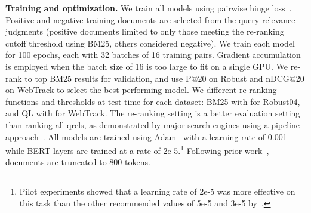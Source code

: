 \documentclass[sigconf]{acmart}
\begin{document}
\textbf{Training and optimization.} We train all models using pairwise hinge loss~\cite{Dehghani2017NeuralRM}. Positive and negative training documents are selected from the query relevance judgments (positive documents limited to only those meeting the re-ranking cutoff threshold  using BM25, others considered negative).
We train each model for 100 epochs, each with 32 batches of 16 training pairs. Gradient accumulation is employed when the batch size of 16 is too large to fit on a single GPU. We re-rank to top  BM25 results for validation, and use P@20 on Robust and nDCG@20 on WebTrack to select the best-performing model. We different re-ranking functions and thresholds at test time for each dataset: BM25 with  for Robust04, and QL with  for WebTrack. The re-ranking setting is a better evaluation setting than ranking all qrels, as demonstrated by major search engines using a pipeline approach~\cite{Rosset2018OptimizingQE}. All models are trained using Adam~\cite{Kingma2015AdamAM} with a learning rate of 0.001 while BERT layers are trained at a rate of 2e-5.\footnote{Pilot experiments showed that a learning rate of 2e-5 was more effective on this task than the other recommended values of 5e-5 and 3e-5 by~\cite{devlin2018bert}.} Following prior work~\cite{Hui2018CoPACRRAC}, documents are truncated to 800 tokens.
\end{document}
